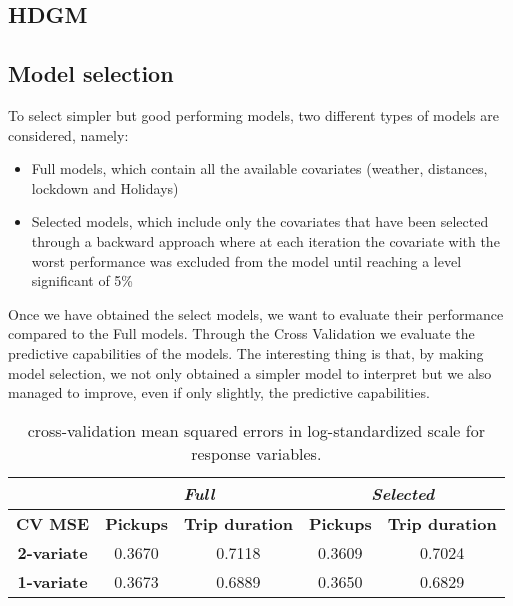 \subsection{HDGM}
\subsection{Model selection} 
To select simpler but good performing models, two different types of models are considered, namely:
\begin{itemize}
	\item Full models, which contain all the available covariates (weather, distances, lockdown and Holidays) 
	\item Selected models, which include only the covariates that have been selected through a backward approach where at each iteration the covariate with the worst performance was excluded from the model until reaching a level significant of \num{5}\%
\end{itemize}
Once we have obtained the select models, we want to evaluate their performance compared to the Full models. Through the Cross Validation we evaluate the predictive capabilities of the models. The interesting thing is that, by making model selection, we not only obtained a simpler model to interpret but we also managed to improve, even if only slightly, the predictive capabilities. 
\begin{table}[h!]
	\centering
	\renewcommand\arraystretch{1.3}
	\begin{tabular}{c|cc|cc}
		\hline
		\multicolumn{1}{l|}{} & \multicolumn{2}{c|}{\textit{Full}} & \multicolumn{2}{c}{\textit{Selected} }\\ 
		\hline
		\textbf{CV MSE} & \multicolumn{1}{c|}{\textbf{Pickups }} & \textbf{Trip duration} & \multicolumn{1}{c|}{\textbf{Pickups}} & \textbf{Trip duration} \\ 
		\hline
		\textbf{2-variate } & \multicolumn{1}{c|}{0.3670}  & 0.7118   & \multicolumn{1}{c|}{0.3609}  & 0.7024   \\ 
		\hline
		\textbf{1-variate } & \multicolumn{1}{c|}{0.3673}  & 0.6889   & \multicolumn{1}{c|}{0.3650}  & 0.6829   \\ 
		\hline
	\end{tabular}
	\caption[Cross-validation mean squared errors in log-standardized scale for response variables (HDGM)]{cross-validation mean squared errors in log-standardized scale for response variables.}
	\label{Cross-validation mean squared errors HDGM}
\end{table}

